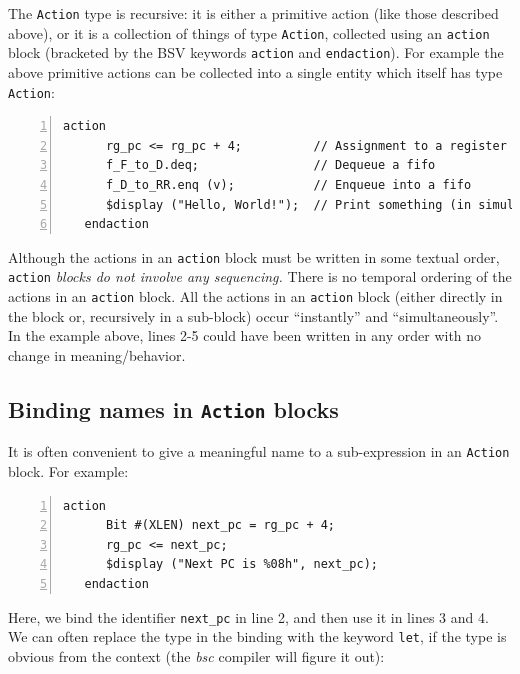 The \verb|Action| type is recursive: it is either a primitive action
(like those described above), or it is a collection of things of type
\verb|Action|, collected using an \verb|action| block (bracketed by
the BSV keywords \verb|action| and \verb|endaction|).  For example the
above primitive actions can be collected into a single entity which
itself has type \verb|Action|:

{\small
\begin{Verbatim}[frame=single, numbers=left]
   action
      rg_pc <= rg_pc + 4;          // Assignment to a register
      f_F_to_D.deq;                // Dequeue a fifo
      f_D_to_RR.enq (v);           // Enqueue into a fifo
      $display ("Hello, World!");  // Print something (in simulation only)
   endaction
\end{Verbatim}
}

Although the actions in an \verb|action| block must be written in some
textual order, \verb|action| \emph{blocks do not involve any
sequencing.}  There is no temporal ordering of the actions in an
\verb|action| block.  All the actions in an \verb|action| block
(either directly in the block or, recursively in a sub-block) occur
``instantly'' and ``simultaneously''.  In the example above, lines 2-5
could have been written in any order with no change in
meaning/behavior.


\subsection{Binding names in {\tt Action} blocks}


It is often convenient to give a meaningful name to a sub-expression
in an {\tt Action} block.  For example:

{\small
\begin{Verbatim}[frame=single, numbers=left]
   action
      Bit #(XLEN) next_pc = rg_pc + 4;
      rg_pc <= next_pc;
      $display ("Next PC is %08h", next_pc);
   endaction
\end{Verbatim}
}

Here, we bind the identifier \verb|next_pc| in line 2, and then use it
in lines 3 and 4.  We can often replace the type in the binding with
the keyword {\tt let}, if the type is obvious from the context (the
\emph{bsc} compiler will figure it out):

